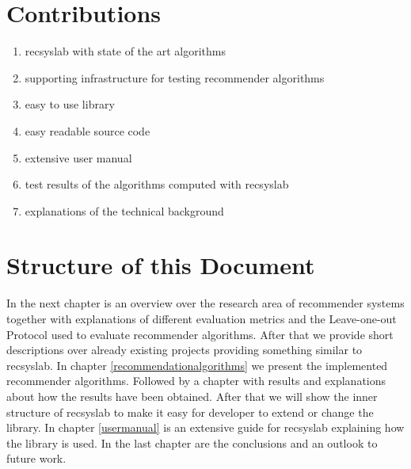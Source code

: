 \section{Contributions}

\begin{enumerate}
    \item recsyslab with state of the art algorithms
    \item supporting infrastructure for testing recommender algorithms
    \item easy to use library
    \item easy readable source code
    \item extensive user manual
    \item test results of the algorithms computed with recsyslab
    \item explanations of the technical background
\end{enumerate}


\section{Structure of this Document}
In the next chapter is an overview over the research area of recommender systems
together with explanations of different evaluation metrics and the Leave-one-out
Protocol used to evaluate recommender algorithms.
After that we provide short descriptions over already existing 
projects providing something similar to recsyslab.
In chapter \ref{recommendationalgorithms} we present the implemented recommender
algorithms. Followed by a chapter with results and explanations about how the
results have been obtained. After that we will show the inner structure of recsyslab
to make it easy for developer to extend or change the library.
In chapter \ref{usermanual} is an extensive guide for recsyslab explaining
how the library is used.
In the last chapter are the conclusions and an outlook to future work.



